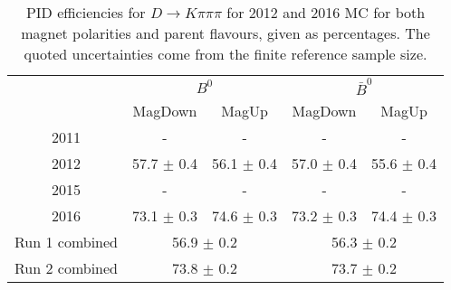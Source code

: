 \begin{table}
    \centering
    \begin{tabular}{ccccc}
        \toprule
        & \multicolumn{2}{c}{$B^0$} &  \multicolumn{2}{c}{$\bar{B}^0$}\\
        & MagDown & MagUp & MagDown & MagUp\\
        \midrule
2011 & - & - & - & - \\
2012 & 57.7 $\pm$ 0.4 & 56.1 $\pm$ 0.4 & 57.0 $\pm$ 0.4 & 55.6 $\pm$ 0.4 \\
2015 & - & - & - & - \\
2016 & 73.1 $\pm$ 0.3 & 74.6 $\pm$ 0.3 & 73.2 $\pm$ 0.3 & 74.4 $\pm$ 0.3 \\
        \midrule
Run 1 combined & \multicolumn{2}{c}{56.9 $\pm$ 0.2} & \multicolumn{2}{c}{56.3 $\pm$ 0.2} \\
Run 2 combined & \multicolumn{2}{c}{73.8 $\pm$ 0.2} & \multicolumn{2}{c}{73.7 $\pm$ 0.2} \\
        \bottomrule
    \end{tabular}
    \caption{PID efficiencies for $D \to K\pi\pi\pi$ for 2012 and 2016 MC for both magnet polarities and parent flavours, given as percentages. The quoted  uncertainties come from the finite reference sample size.}
\label{tab:PID_efficiency_Kpipipi}
\end{table}
